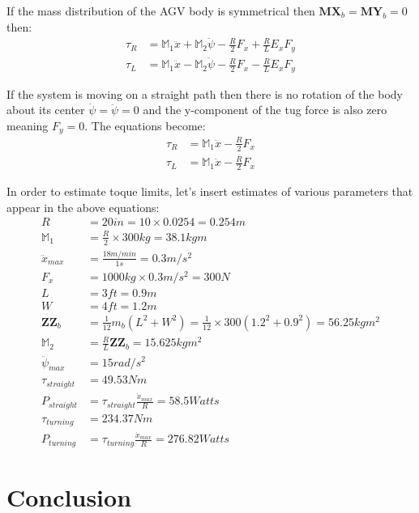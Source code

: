 \documentclass[a4paper,10pt]{article}
\begin{document}
If the mass distribution of the AGV body is symmetrical then $\mathbf{MX}_b = \mathbf{MY}_b = 0$ then:
\begin{align}
 \tau_R &= \mathbb{M}_1\ddot{x} + \mathbb{M}_2\ddot\psi - \frac{R}{2}F_x + \frac{R}{L}E_xF_y \label{turning1} \\
 \tau_L &= \mathbb{M}_1\ddot{x} - \mathbb{M}_2\ddot\psi - \frac{R}{2}F_x - \frac{R}{L}E_xF_y  \label{turning2}
\end{align}

If the system is moving on a straight path then there is no rotation of the body about its center $\dot\psi = \ddot\psi = 0$ and the 
y-component of the tug force is also zero meaning $F_y = 0$. The equations become:
\begin{align}
 \tau_R &= \mathbb{M}_1\ddot{x} - \frac{R}{2}F_x \label{straight1} \\
 \tau_L &= \mathbb{M}_1\ddot{x} - \frac{R}{2}F_x \label{straight2}
\end{align}

In order to estimate toque limits, let's insert estimates of various parameters that appear in the above equations:
\begin{align}
 R &= 20 in = 10 \times 0.0254 = 0.254 m \nonumber \\
 \mathbb{M}_1 &= \frac{R}{2} \times 300 kg =  38.1 kgm \nonumber \\
 \ddot{x}_{max} &= \frac{18 m/min}{1 s} = 0.3 m/s^2 \nonumber \\
 F_x &= 1000 kg \times 0.3 m/s^2 = 300 N \nonumber \\
 L &= 3 ft = 0.9 m \nonumber \\
 W &= 4 ft = 1.2 m \nonumber \\
 \mathbf{ZZ}_b &= \frac{1}{12}m_b\left(L^2+W^2\right) = \frac{1}{12}\times 300 \left(1.2^2+0.9^2\right) = 56.25 kgm^2 \nonumber \\
 \mathbb{M}_2 &= \frac{R}{L}\mathbf{ZZ}_b = 15.625 kgm^2 \nonumber \\
 \ddot\psi_{max} &= 15 rad/s^2 \nonumber \\
 \tau_{straight} &= 49.53 Nm \nonumber \\
 P_{straight} &= \tau_{straight} \frac{\dot{x}_{max}}{R} = 58.5 Watts \nonumber \\
 \tau_{turning} &= 234.37 Nm \nonumber \\
 P_{turning} &= \tau_{turning} \frac{\dot{x}_{max}}{R} = 276.82 Watts \nonumber 
\end{align}


\section{Conclusion}
\end{document}
